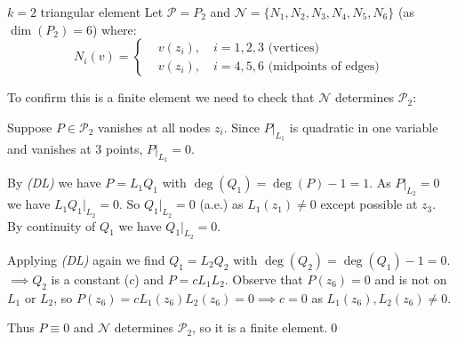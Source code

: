 \begin{example}{$k=2$ triangular element}{}
    Let $\mathcal{P} = P_2$ and $\mathcal{N} = \{N_1, N_2, N_3, N_4, N_5, N_6\}$ (as $\dim(P_2) = 6$) where:
    \[
        N_i(v) =
        \begin{cases}
             & v(z_i), \quad i = 1, 2, 3 \text{ (vertices) }           \\
             & v(z_i), \quad i = 4, 5, 6 \text{ (midpoints of edges) }
        \end{cases}
    \]
    \begin{center}
    \end{center}
    To confirm this is a finite element we need to check that $\mathcal{N}$ determines $\mathcal{P}_2$:

    Suppose $P \in \mathcal{P}_2$ vanishes at all nodes $z_i$. Since $P|_{L_1}$ is quadratic in one variable and vanishes at $3$ points, $P|_{L_1} = 0$.

    By \emph{(DL)} we have $P = L_1 Q_1$ with $\deg(Q_1) = \deg(P) - 1 = 1$.
    As $P|_{L_2} = 0$ we have $L_1Q_1|_{L_2} = 0$. So $Q_1|_{L_2} = 0$ (a.e.) as $L_1(z_1) \neq 0$ except possible at $z_3$.
    By continuity of $Q_1$ we have $Q_1|_{L_2} = 0$.

    Applying \emph{(DL)} again we find $Q_1 = L_2 Q_2$ with $\deg(Q_2) = \deg(Q_1) - 1 = 0$.
    $\implies Q_2$ is a constant ($c$) and $P = c L_1 L_2$. Observe that $P(z_6) = 0$ and is not on $L_1$ or $L_2$, so $P(z_6) = c L_1(z_6) L_2(z_6) = 0 \implies c = 0$ as $L_1(z_6), L_2(z_6) \neq 0$.

    Thus $P \equiv 0$ and $\mathcal{N}$ determines $\mathcal{P}_2$, so it is a finite element.\qed

\end{example}

